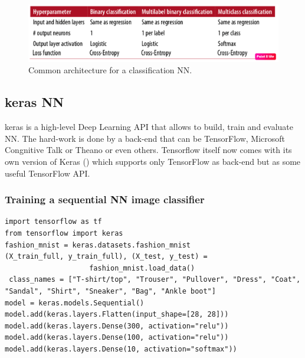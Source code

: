\begin{figure}
\includegraphics[scale=0.4]{img/NNClassArchitecture}
\caption{Common architecture for a classification NN.}
\end{figure}

\subsection{keras NN}
keras is a high-level Deep Learning API that allows to build, train and evaluate NN. The hard-work is done by a back-end that can be TensorFlow, Microsoft Congnitive Talk or Theano or even others. Tensorflow itself now comes with its own version of Keras () which supports only TensorFlow as back-end but as some useful TensorFlow API.

\subsubsection{Training a sequential NN image classifier}
\begin{lstlisting}
import tensorflow as tf
from tensorflow import keras
fashion_mnist = keras.datasets.fashion_mnist
(X_train_full, y_train_full), (X_test, y_test) = 
					fashion_mnist.load_data()
 class_names = ["T-shirt/top", "Trouser", "Pullover", "Dress", "Coat", "Sandal", "Shirt", "Sneaker", "Bag", "Ankle boot"]
model = keras.models.Sequential()
model.add(keras.layers.Flatten(input_shape=[28, 28]))
model.add(keras.layers.Dense(300, activation="relu"))
model.add(keras.layers.Dense(100, activation="relu"))
model.add(keras.layers.Dense(10, activation="softmax"))
\end{lstlisting}

